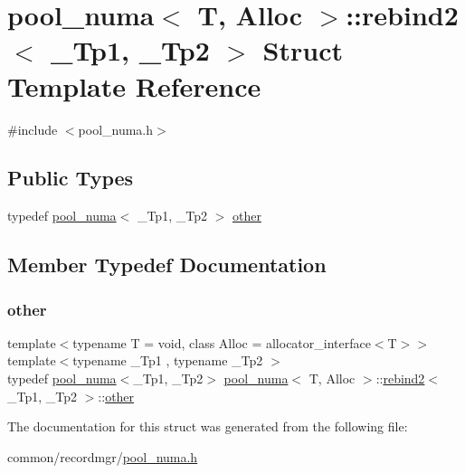 \hypertarget{structpool__numa_1_1rebind2}{}\section{pool\+\_\+numa$<$ T, Alloc $>$\+:\+:rebind2$<$ \+\_\+\+Tp1, \+\_\+\+Tp2 $>$ Struct Template Reference}
\label{structpool__numa_1_1rebind2}


{\ttfamily \#include $<$pool\+\_\+numa.\+h$>$}

\subsection*{Public Types}
\begin{DoxyCompactItemize}
\item 
typedef \hyperlink{classpool__numa}{pool\+\_\+numa}$<$ \+\_\+\+Tp1, \+\_\+\+Tp2 $>$ \hyperlink{structpool__numa_1_1rebind2_afd971dd40871a194218c2c3b1135257b}{other}
\end{DoxyCompactItemize}


\subsection{Member Typedef Documentation}
\mbox{\label{structpool__numa_1_1rebind2_afd971dd40871a194218c2c3b1135257b}} 
\subsubsection{\texorpdfstring{other}{other}}
{\footnotesize\ttfamily template$<$typename T  = void, class Alloc  = allocator\+\_\+interface$<$\+T$>$$>$ \\
template$<$typename \+\_\+\+Tp1 , typename \+\_\+\+Tp2 $>$ \\
typedef \hyperlink{classpool__numa}{pool\+\_\+numa}$<$\+\_\+\+Tp1, \+\_\+\+Tp2$>$ \hyperlink{classpool__numa}{pool\+\_\+numa}$<$ T, Alloc $>$\+::\hyperlink{structpool__numa_1_1rebind2}{rebind2}$<$ \+\_\+\+Tp1, \+\_\+\+Tp2 $>$\+::\hyperlink{structpool__numa_1_1rebind2_afd971dd40871a194218c2c3b1135257b}{other}}



The documentation for this struct was generated from the following file\+:\begin{DoxyCompactItemize}
\item 
common/recordmgr/\hyperlink{pool__numa_8h}{pool\+\_\+numa.\+h}\end{DoxyCompactItemize}

